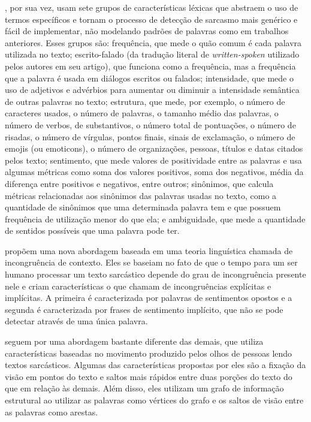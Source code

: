 \cite{barbieri:2014:modelling-sarcasm}, por sua vez, usam sete grupos de
características léxicas que abstraem o uso de termos específicos e tornam o
processo de detecção de sarcasmo mais genérico e fácil de implementar, não
modelando padrões de palavras como em trabalhos anteriores. Esses grupos são:
frequência, que mede o quão comum é cada palavra utilizada no texto;
escrito-falado (da tradução literal de \textit{written-spoken} utilizado pelos
autores em seu artigo), que funciona como a frequência, mas a frequência que a
palavra é usada em diálogos escritos ou falados; intensidade, que mede o uso de
adjetivos e advérbios para aumentar ou diminuir a intensidade semântica de
outras palavras no texto; estrutura, que mede, por exemplo, o número de
caracteres usados, o número de palavras, o tamanho médio das palavras, o número
de verbos, de substantivos, o número total de pontuações, o número de risadas, o
número de vírgulas, pontos finais, sinais de exclamação, o número de emojis (ou
emoticons), o número de organizações, pessoas, títulos e datas citados pelos
texto; sentimento, que mede valores de positividade entre as palavras e usa
algumas métricas como soma dos valores positivos, soma dos negativos, média da
diferença entre positivos e negativos, entre outros; sinônimos, que calcula
métricas relacionadas aos sinônimos das palavras usadas no texto, como a
quantidade de sinônimos que uma determinada palavra tem e que possuem frequência
de utilização menor do que ela; e ambiguidade, que mede a quantidade de sentidos
possíveis que uma palavra pode ter.

\cite{joshi:2015:context-incongruity} propõem uma nova abordagem baseada em uma
teoria linguística chamada de incongruência de contexto. Eles se baseiam no fato
de que o tempo para um ser humano processar um texto sarcástico depende do grau
de incongruência presente nele e criam características o que chamam de
incongruências explícitas e implícitas. A primeira é caracterizada por palavras
de sentimentos opostos e a segunda é caracterizada por frases de sentimento
implícito, que não se pode detectar através de uma única palavra.

\cite{mishra:2016:harnessing-cognitive} seguem por uma abordagem bastante
diferente das demais, que utiliza características baseadas no movimento
produzido pelos olhos de pessoas lendo textos sarcásticos. Algumas das
características propostas por eles são a fixação da visão em pontos do texto e
saltos mais rápidos entre duas porções do texto do que em relação às demais.
Além disso, eles utilizam um grafo de informação estrutural ao utilizar as
palavras como vértices do grafo e os saltos de visão entre as palavras como
arestas.

